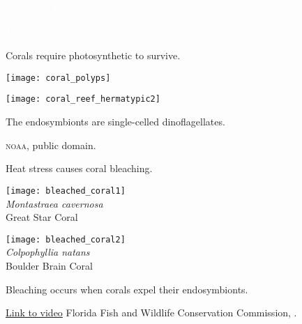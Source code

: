 \documentclass[t]{beamer}
\begin{document}

{
	\begin{frame}[b]{\hfill\textcolor{white}{$\dots$ and coral reefs.}}
		
		\tiny\hfill\textcolor{white}{James Watt, NOAA}
	\end{frame}
}

\begin{frame}[t]{Corals require photosynthetic  to survive.}
	\vspace{-\baselineskip}
	
	\begin{multicols}{2}
		
			\texttt{[image: coral\_polyps]}

		\columnbreak
			
			\texttt{[image: coral\_reef\_hermatypic2]} 
		
	\end{multicols}
	
	\textcolor{white!50!black}{The endosymbionts are single-celled dinoflagellates.}
	
	\tinyfill \textsc{noaa,} public domain.
	
\end{frame}


\begin{frame}[t]{Heat stress causes coral bleaching.}
	\vspace{-\baselineskip}
	
	\begin{multicols}{2}
		
		\texttt{[image: bleached\_coral1]} \\
		\textit{Montastraea cavernosa} \\ Great Star Coral
		
		\columnbreak
		
		\texttt{[image: bleached\_coral2]}\\
		\textit{Colpophyllia natans} \\ Boulder Brain Coral
		 
		
	\end{multicols}
	
	\hangpara Bleaching occurs when corals expel their endosymbionts.
	
	\vfilll
	
	\tiny \href{https://www.flickr.com/photos/myfwc/53138631119/in/album-72177720309991225}{Link to video} \hfill Florida Fish and Wildlife Conservation Commission, .
	
\end{frame}
\end{document}
